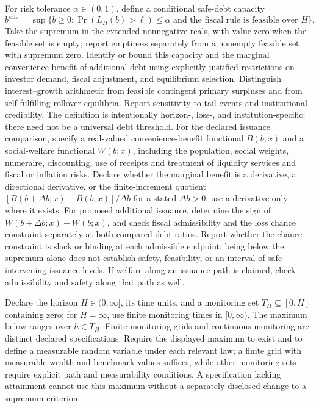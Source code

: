 \documentclass[11pt,a4paper]{article}
\begin{document}
For risk tolerance \(\alpha\in(0,1)\), define a conditional safe-debt capacity
\[
b^{\mathrm{safe}}=
\sup\{b\ge0:\Pr(L_H(b)>\ell)\le\alpha
\text{ and the fiscal rule is feasible over }H\}.
\]
Take the supremum in the extended nonnegative reals, with value zero when the feasible set is empty; report emptiness separately from a nonempty feasible set with supremum zero. Identify or bound this capacity and the marginal convenience benefit of additional debt using explicitly justified restrictions on investor demand, fiscal adjustment, and equilibrium selection. Distinguish interest–growth arithmetic from feasible contingent primary surpluses and from self-fulfilling rollover equilibria. Report sensitivity to tail events and institutional credibility. The definition is intentionally horizon-, loss-, and institution-specific; there need not be a universal debt threshold. For the declared issuance comparison, specify a real-valued convenience-benefit functional \(B(b;x)\) and a social-welfare functional \(W(b;x)\), including the population, social weights, numeraire, discounting, use of receipts and treatment of liquidity services and fiscal or inflation risks. Declare whether the marginal benefit is a derivative, a directional derivative, or the finite-increment quotient \([B(b+\Delta b;x)-B(b;x)]/\Delta b\) for a stated \(\Delta b>0\); use a derivative only where it exists. For proposed additional issuance, determine the sign of \(W(b+\Delta b;x)-W(b;x)\), and check fiscal admissibility and the loss chance constraint separately at both compared debt ratios. Report whether the chance constraint is slack or binding at each admissible endpoint; being below the supremum alone does not establish safety, feasibility, or an interval of safe intervening issuance levels. If welfare along an issuance path is claimed, check admissibility and safety along that path as well.

Declare the horizon \(H\in(0,\infty]\), its time units, and a monitoring set \(T_H\subseteq[0,H]\) containing zero; for \(H=\infty\), use finite monitoring times in \([0,\infty)\). The maximum below ranges over \(h\in T_H\). Finite monitoring grids and continuous monitoring are distinct declared specifications. Require the displayed maximum to exist and to define a measurable random variable under each relevant law; a finite grid with measurable wealth and benchmark values suffices, while other monitoring sets require explicit path and measurability conditions. A specification lacking attainment cannot use this maximum without a separately disclosed change to a supremum criterion.
\end{document}
